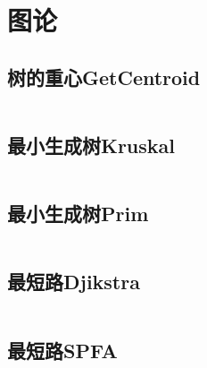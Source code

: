 \documentclass[10pt,a4paper,twoside]{ctexart}
\renewcommand{\_}{\textscale{1}{\textunderscore}} %
\begin{document}
\title{}
\author {\\}
\maketitle

\begin{figure}[htbp]
\end{figure}
\thispagestyle{empty}

\newpage

\tableofcontents

\newpage
\section{图论}
\subsection{树的重心Get\_Centroid}
\inputminted{c++}{../图论/树的重心Get_Centroid.cpp}
\subsection{最小生成树Kruskal}
\inputminted{c++}{../图论/最小生成树Kruskal.cpp}
\subsection{最小生成树Prim}
\inputminted{c++}{../图论/最小生成树Prim.cpp}
\subsection{最短路Djikstra}
\inputminted{c++}{../图论/最短路Djikstra.cpp}
\subsection{最短路SPFA}
\inputminted{c++}{../图论/最短路SPFA.cpp}
\end{document}

